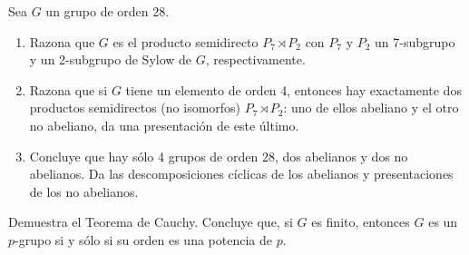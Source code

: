 \documentclass[12pt]{article}
\begin{document}
    \begin{ejercicio}[2 puntos]
        Sea $G$ un grupo de orden 28.
        \begin{enumerate}[label=(\alph*)]
            \item Razona que $G$ es el producto semidirecto $P_7 \rtimes P_2$ con $P_7$ y $P_2$ un 7-subgrupo y un 2-subgrupo de Sylow de $G$, respectivamente.
            \item Razona que si $G$ tiene un elemento de orden 4, entonces hay exactamente dos productos semidirectos (no isomorfos) $P_7 \rtimes P_2$: uno de ellos abeliano y el otro no abeliano, da una presentación de este último.
            \item Concluye que hay sólo 4 grupos de orden 28, dos abelianos y dos no abelianos. Da las descomposiciones cíclicas de los abelianos y presentaciones de los no abelianos.
        \end{enumerate}
    \end{ejercicio}

    \begin{ejercicio}[2 puntos]
        Demuestra el Teorema de Cauchy. Concluye que, si $G$ es finito, entonces $G$ es un $p$-grupo si y sólo si su orden es una potencia de $p$.
    \end{ejercicio}
\end{document}
